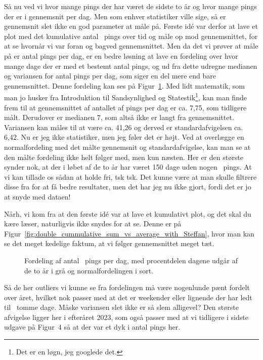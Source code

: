 \begin{article}
Så nu ved vi hvor mange pings der har været de sidste to år og hvor mange pings der er i gennemsnit per dag. Men som enhver statistiker ville sige, så er gennemsnit slet ikke en god parameter at måle på.
Første idé var derfor at lave et plot med det kumulative antal \coffee\ pings over tid og måle op mod gennemsnittet, for at se hvornår vi var foran og bagved gennemsnittet.
Men da det vi prøver at måle på er antal pings per dag, er en bedre løsning at lave en fordeling over hvor mange dage der er med et bestemt antal pings, og ud fra dette udregne medianen og variansen for antal pings per dag, som siger en del mere end bare gennemsnittet. Denne fordeling kan ses på Figur~\ref{fig:days_count_distribution}.
Med lidt matematik, som man jo husker fra Introduktion til Sandsynlighed og Statestik\footnote{Det er en løgn, jeg googlede det.}, kan man finde frem til at gennemsnittet af antallet af pings per dag er ca. 7,75, som tidligere målt. Derudover er medianen 7, som altså ikke er langt fra gennemsnittet. Variansen kan måles til at være ca. 41,26 og derved er standardafvigelsen ca. 6,42. Nu er jeg ikke statistiker, men jeg føler det er højt.
Ved at overlægge en normalfordeling med det målte gennemsnit og standardafvigelse, kan man se at den målte fordeling ikke helt følger med, men kun næsten.
Her er den største synder nok, at der i løbet af de to år har været 150 dage uden nogen \coffee\ pings. At vi kan tillade os sådan at holde fri, tsk tsk. Det kunne være at man skulle filtrere disse fra for at få bedre resultater, men det har jeg nu ikke gjort, fordi det er jo at snyde med dataen!

Nårh, vi kom fra at den første idé var at lave et kumulativt plot, og det skal du kære læser, naturligvis ikke snydes for at se. Denne er på Figur~\ref{fig:double_cummulative_sum_vs_average_with_Steffan}, hvor man kan se det meget kedelige faktum, at vi følger gennemsnittet meget tæt.
%
\begin{figure}[H]
	\centering
	\resizebox{\linewidth}{!}{}
	\vspace{-20pt}
	\caption{Fordeling af antal \protect\coffee\ pings per dag, med procentdelen dagene udgår af de to år i grå og normalfordelingen i sort.}
	\label{fig:days_count_distribution}
\end{figure}
%
\noindent
Så de her outliers vi kunne se fra fordelingen må være nogenlunde pænt fordelt over året, hvilket nok passer med at det er weekender eller lignende der har ledt til \coffee\ tomme dage. Måske variansen slet ikke er så slem alligevel?
Den største afvigelse ligger her i efteråret 2023, som også passer med at vi tidligere i sidste udgave på Figur~4 så at der var et dyk i antal pings her.


\end{article}
